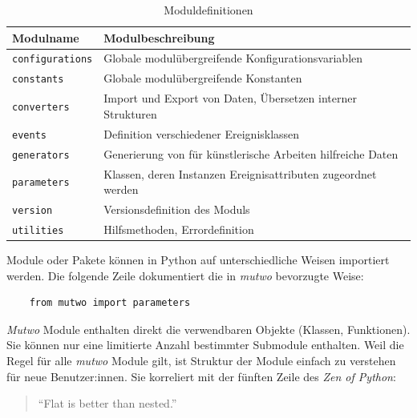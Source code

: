 \documentclass[12pt,a4paper,ngerman]{article}
\begin{document}
\begin{table}[h!]
    \begin{center}
        \begin{tabular}{l l} 
            \hline
            Modulname & Modulbeschreibung \\ [0.5ex] 
            \hline\hline
            \texttt{configurations} & Globale modulübergreifende Konfigurationsvariablen \\
            \texttt{constants} & Globale modulübergreifende Konstanten \\
            \texttt{converters} & Import und Export von Daten, Übersetzen interner Strukturen \\
            \texttt{events} & Definition verschiedener Ereignisklassen \\
            \texttt{generators} & Generierung von für künstlerische Arbeiten hilfreiche Daten \\
            \texttt{parameters} & Klassen, deren Instanzen Ereignisattributen zugeordnet werden \\
            \texttt{version} & Versionsdefinition des Moduls \\
            \texttt{utilities} & Hilfsmethoden, Errordefinition \\ [1ex] 
            \hline
        \end{tabular}\label{table:modulDefinition}
    \end{center}

    \caption{Moduldefinitionen}
\end{table}

Module oder Pakete können in Python auf unterschiedliche Weisen importiert werden.
Die folgende Zeile dokumentiert die in \emph{mutwo} bevorzugte Weise:

\lstset{language=Python}

\begin{lstlisting}
    from mutwo import parameters
\end{lstlisting}

\emph{Mutwo} Module enthalten direkt die verwendbaren Objekte (Klassen, Funktionen).
Sie können nur eine limitierte Anzahl bestimmter Submodule enthalten.
Weil die Regel für alle \emph{mutwo} Module gilt, ist Struktur der Module einfach zu verstehen für neue Benutzer:innen.
Sie korreliert mit der fünften Zeile des \emph{Zen of Python}:

\begin{quote}
    ``Flat is better than nested.''~\parencite{theZenOfPython}
\end{quote}
\end{document}
